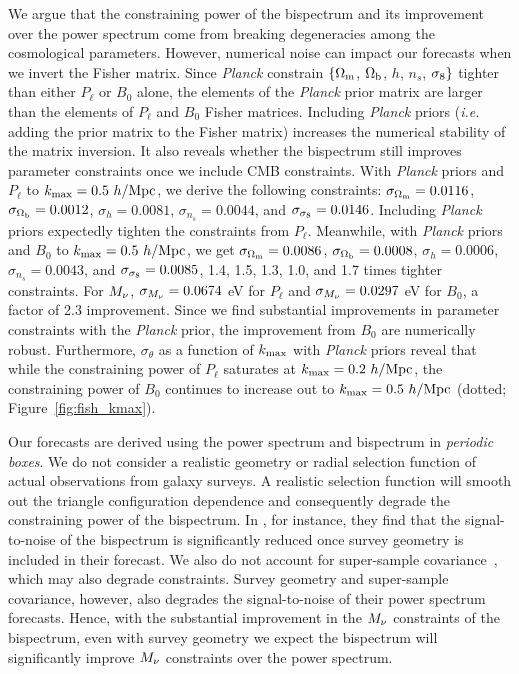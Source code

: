 We argue that the constraining power of the bispectrum and its improvement 
over the power spectrum come from breaking degeneracies among the cosmological 
parameters. However, numerical noise can impact our forecasts when we invert 
the Fisher matrix. Since {\em Planck} constrain $\{\Omega_{\rm m}$, $\Omega_{\rm b}$, $h$, $n_s$, $\sigma_8\}$ 
tighter than either $P_\ell$ or $B_0$ alone, the elements of the {\em Planck} prior 
matrix are larger than the elements of $P_\ell$ and $B_0$ Fisher matrices. 
Including {\em Planck} priors (\emph{i.e.} adding the prior matrix to the 
Fisher matrix) increases the numerical stability of the matrix inversion. 
It also reveals whether the bispectrum still improves parameter constraints 
once we include CMB constraints. With {\em Planck} priors and $P_\ell$ to 
$k_{\rm max} = 0.5~h/{\rm Mpc}$, we derive the following constraints: 
$\sigma_{\Omega_{\rm m}} = 0.0116$, $\sigma_{\Omega_{\rm b}} = 0.0012$, $\sigma_h=0.0081$, 
$\sigma_{n_s}=0.0044$, and $\sigma_{\sigma_8}=0.0146$. 
Including {\em Planck} priors expectedly tighten the constraints from $P_\ell$. 
Meanwhile, with {\em Planck} priors and $B_0$ to $k_{\rm max} = 0.5~h/{\rm Mpc}$, we get 
$\sigma_{\Omega_{\rm m}} = 0.0086$, $\sigma_{\Omega_{\rm b}} = 0.0008$, $\sigma_h=0.0006$, 
$\sigma_{n_s}=0.0043$, and $\sigma_{\sigma_8}=0.0085$, 1.4, 1.5, 1.3, 1.0, and 1.7 
times tighter constraints. For $M_\nu$, $\sigma_{M_\nu} = 0.0674$ eV for $P_\ell$ 
and $\sigma_{M_\nu} = 0.0297$ eV for $B_0$, a factor of 2.3 improvement. Since we find
substantial improvements in parameter constraints with the {\em Planck} prior, 
the improvement from $B_0$ are numerically robust. Furthermore, $\sigma_\theta$ 
as a function of $k_{\rm max}$ with {\em Planck} priors reveal that while the 
constraining power of $P_\ell$ saturates at $k_{\rm max} = 0.2~h/{\rm Mpc}$, the constraining 
power of $B_0$ continues to increase out to $k_{\rm max} = 0.5~h/{\rm Mpc}$ 
(dotted; Figure~\ref{fig:fish_kmax}). 

Our forecasts are derived using the power spectrum and bispectrum in
\emph{periodic boxes}. We do not consider a realistic geometry or radial selection 
function of actual observations from galaxy 
surveys. A realistic selection function will smooth out the triangle 
configuration dependence and consequently degrade the constraining power 
of the bispectrum. In \cite{sefusatti2005}, for instance, they find that the 
signal-to-noise of the bispectrum is significantly reduced once survey geometry 
is included in their forecast. We also do not account for super-sample 
covariance~\citep[\emph{e.g.}][]{hamilton2006, sefusatti2006, takada2013, li2018}, 
which may also degrade constraints. Survey geometry and super-sample covariance, 
however, also degrades the signal-to-noise of their power spectrum forecasts. 
Hence, with the substantial improvement in the $M_\nu$ constraints of the bispectrum, 
even with survey geometry we expect the bispectrum will significantly improve 
$M_\nu$ constraints over the power spectrum.  

